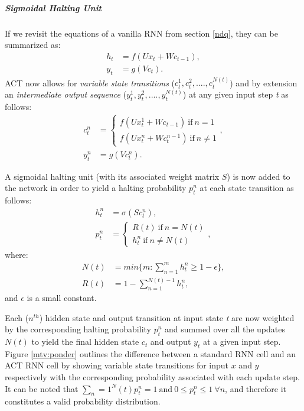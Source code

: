 \subparagraph{Sigmoidal Halting Unit} If we revisit the equations of a vanilla RNN from section \ref{ndq}, they can be summarized as:
\begin{equation}
\begin{aligned}
h_t &= f(Ux_t + Wc_{t-1}), \\
y_t &= g(Vc_t).
\end{aligned}
\end{equation}
ACT now allows for \textit{variable state transitions} ($c_t^1, c_t^2,...., c_t^{N(t)}$) and by extension an \textit{intermediate output sequence} ($y_t^1, y_t^2,...., y_t^{N(t)}$) at any given input step \textit{t} as follows:
\begin{equation}
\begin{aligned}
c_t^n &= \begin{cases} f(Ux_t^1 + Wc_{t-1})\ \text{if}\ n = 1 \\ f(Ux_t^n + Wc_t^{n-1})\ \text{if}\ n \neq 1  \end{cases}, \\
y_t^n &= g(Vc_t^n).
\end{aligned}
\end{equation}

A sigmoidal halting unit (with its associated weight matrix $S$) is now added to the network in order to yield a halting probability $p_t^n$ at each state transition as follows:
\begin{equation}
\begin{aligned}
h_t^n &= \sigma(Sc_t^n), \\
p_t^n &= \begin{cases} R(t)\ \text{if}\ n = N(t) \\ h_t^n\ \text{if}\ n \neq N(t)  \end{cases},
\end{aligned}
\end{equation}
where:
\begin{equation}
\begin{aligned}
N(t) &= min\{m : \sum_{n=1}^m h_t^n \geq 1 - \epsilon\}, \\
R(t) &= 1 - \sum_{n=1}^{N(t)-1} h_t^n,
\end{aligned}	
\end{equation}
and $\epsilon$ is a small constant.

Each ($n^{th}$) hidden state and output transition at input state \textit{t} are now weighted by the corresponding halting probability $p_t^n$ and summed over all the updates $N(t)$ to yield the final hidden state $c_t$ and output $y_t$ at a given input step. Figure \ref{mtv:ponder} outlines the difference between a standard RNN cell and an ACT RNN cell by showing variable state transitions for input $x$ and $y$ respectively with the corresponding probability associated with each update step. It can be noted that $\sum_n=1^N(t) p_t^n = 1\ \text{and}\ 0 \leq p_t^n \leq 1\ \forall n$, and therefore it constitutes a valid probability distribution.

